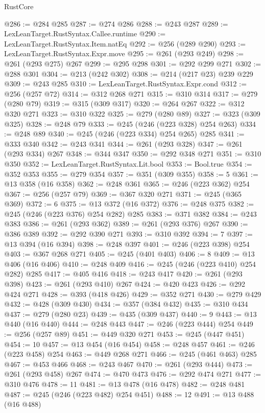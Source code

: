 \begin{lexlean}{RustCore}
\begin{coremodule}
@286 := @284 @285
@287 := @274 @286
@288 := @243 @287
@289 := LexLeanTarget.RustSyntax.Callee.runtime
@290 := LexLeanTarget.RustSyntax.Item.natEq
@292 := @256 (@289 @290)
@293 := LexLeanTarget.RustSyntax.Expr.move
@295 := @261 (@293 @249)
@298 := @261 (@293 @275) @267
@299 := @295 @298
@301 := @292 @299 @271
@302 := @288 @301
@304 := @213 (@242 @302)
@308 := @214 (@217 @23) @239 @229
@309 := @243 @285
@310 := LexLeanTarget.RustSyntax.Expr.cond
@312 := @256 (@257 @72)
@314 := @312 @268 @271
@315 := @310 @314
@317 := @279 (@280 @79)
@319 := @315 (@309 @317)
@320 := @264 @267
@322 := @312 @320 @271
@323 := @310 @322
@325 := @279 (@280 @89)
@327 := @323 (@309 @325)
@328 := @248 @79
@333 := @245 (@246 (@223 @328) @254 @263)
@334 := @248 @89
@340 := @245 (@246 (@223 @334) @254 @265) @285
@341 := @333 @340
@342 := @243 @341
@344 := @261 (@293 @328)
@347 := @261 (@293 @334) @267
@348 := @344 @347
@350 := @292 @348 @271
@351 := @310 @350
@352 := LexLeanTarget.RustSyntax.Lit.bool
@353 := Bool.true
@354 := @352 @353
@355 := @279 @354
@357 := @351 (@309 @355)
@358 := 5
@361 := @13 @358 (@16 @358)
@362 := @248 @361
@365 := @246 (@223 @362) @254
@367 := @256 (@257 @79)
@369 := @367 @320 @271
@371 := @245 (@365 @369)
@372 := 6
@375 := @13 @372 (@16 @372)
@376 := @248 @375
@382 := @245 (@246 (@223 @376) @254 @282) @285
@383 := @371 @382
@384 := @243 @383
@386 := @261 (@293 @362)
@389 := @261 (@293 @376) @267
@390 := @386 @389
@392 := @292 @390 @271
@393 := @310 @392
@394 := 7
@397 := @13 @394 (@16 @394)
@398 := @248 @397
@401 := @246 (@223 @398) @254
@403 := @367 @268 @271
@405 := @245 (@401 @403)
@406 := 8
@409 := @13 @406 (@16 @406)
@410 := @248 @409
@416 := @245 (@246 (@223 @410) @254 @282) @285
@417 := @405 @416
@418 := @243 @417
@420 := @261 (@293 @398)
@423 := @261 (@293 @410) @267
@424 := @420 @423
@426 := @292 @424 @271
@428 := @393 (@418 @426)
@429 := @352 @271
@430 := @279 @429
@432 := @428 (@309 @430)
@434 := @357 (@384 @432)
@435 := @310 @434
@437 := @279 (@280 @23)
@439 := @435 (@309 @437)
@440 := 9
@443 := @13 @440 (@16 @440)
@444 := @248 @443
@447 := @246 (@223 @444) @254
@449 := @256 (@257 @89)
@451 := @449 @320 @271
@453 := @245 (@447 @451)
@454 := 10
@457 := @13 @454 (@16 @454)
@458 := @248 @457
@461 := @246 (@223 @458) @254
@463 := @449 @268 @271
@466 := @245 (@461 @463) @285
@467 := @453 @466
@468 := @243 @467
@470 := @261 (@293 @444)
@473 := @261 (@293 @458) @267
@474 := @470 @473
@476 := @292 @474 @271
@477 := @310 @476
@478 := 11
@481 := @13 @478 (@16 @478)
@482 := @248 @481
@487 := @245 (@246 (@223 @482) @254 @451)
@488 := 12
@491 := @13 @488 (@16 @488)

\end{coremodule}
\end{lexlean}
